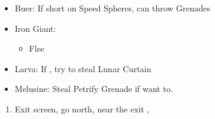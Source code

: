\begin{encounters}
  \begin{itemize}
    \item Buer: If short on Speed Spheres, can throw Grenades
    \item Iron Giant:
          \begin{itemize}
            \switch{\tidus}{\rikku}
            \rikkuf Steal Light Curtain
            \switch{\wakka}{\tidus}
            \tidusf Defend
            \enemyf Attacks \rikku
            \auronf Defend
            \item Flee 
          \end{itemize}
    \item Larva: If \blitzloss, try to steal Lunar Curtain
    \item Melusine: Steal Petrify Grenade if want to.
  \end{itemize}
\end{encounters}
\begin{enumerate}[resume]
  \item Exit screen, go north, near the exit \sd, \cs[3:10]
\end{enumerate}